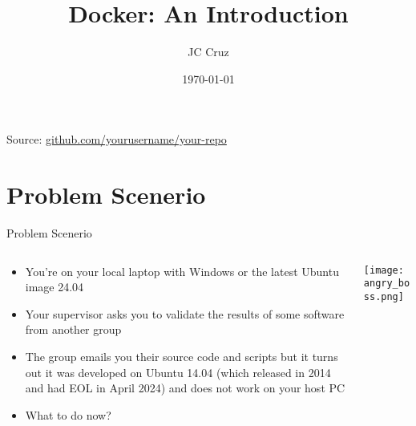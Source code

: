 \documentclass{beamer}
\title{Docker: An Introduction}
\author{JC Cruz}
\date{\today}
\begin{document}
\begin{frame}[plain]
    \titlepage
    
    \vfill
    \begin{center}
        \small{Source: \href{https://github.com/yourusername/your-repo}{github.com/yourusername/your-repo}}
    \end{center}
\end{frame}

\section{Problem Scenerio}

\begin{frame}{Problem Scenerio}
    \vspace{-20pt}
    \begin{columns}[T]
        \begin{column}{0.6\textwidth}
            \begin{itemize}
                \item You're on your local laptop with Windows or the latest Ubuntu image 24.04
                \item Your supervisor asks you to validate the results of some software from another group
                \item The group emails you their source code and scripts but it turns out it was developed on Ubuntu 14.04 (which released in 2014 and had EOL in April 2024) and does not work on your host PC
                \item What to do now?
            \end{itemize}
        \end{column}
        \begin{column}{0.4\textwidth}
            \texttt{[image: angry\_boss.png]}
        \end{column}
    \end{columns}
\end{frame}
\end{document}
